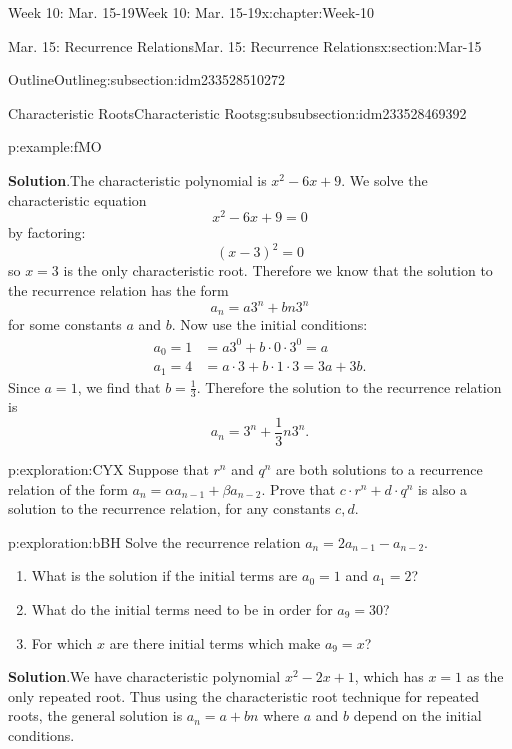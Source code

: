 \documentclass[oneside,10pt,]{book}
\newcommand{\blocktitlefont}{\relax}
\numberwithin{equation}{section}
\newcommand{\amp}{&}
\begin{document}
\begin{chapterptx}{Week 10: Mar. 15-19}{}{Week 10: Mar. 15-19}{}{}{x:chapter:Week-10}
\begin{sectionptx}{Mar. 15: Recurrence Relations}{}{Mar. 15: Recurrence Relations}{}{}{x:section:Mar-15}
\begin{subsectionptx}{Outline}{}{Outline}{}{}{g:subsection:idm233528510272}
\begin{subsubsectionptx}{Characteristic Roots}{}{Characteristic Roots}{}{}{g:subsubsection:idm233528469392}
\begin{example}{}{p:example:fMO}
\par\smallskip%
\noindent\textbf{\blocktitlefont Solution}.\hypertarget{p:solution:NJk}{}\quad{}The characteristic polynomial is \(x^2 - 6x + 9\). We solve the characteristic equation%
\begin{equation*}
x^2 - 6x + 9 = 0
\end{equation*}
by factoring:%
\begin{equation*}
(x - 3)^2 = 0
\end{equation*}
so \(x =3\) is the only characteristic root. Therefore we know that the solution to the recurrence relation has the form%
\begin{equation*}
a_n = a 3^n + bn3^n
\end{equation*}
for some constants \(a\) and \(b\). Now use the initial conditions:%
\begin{align*}
a_0 = 1 \amp = a 3^0 + b\cdot 0 \cdot 3^0 = a\\
a_1 = 4 \amp = a\cdot 3 + b\cdot 1 \cdot3 = 3a + 3b\text{.}
\end{align*}
Since \(a = 1\), we find that \(b = \frac{1}{3}\). Therefore the solution to the recurrence relation is%
\begin{equation*}
a_n = 3^n + \frac{1}{3}n3^n\text{.}
\end{equation*}
%
\end{example}
\begin{exploration}{}{p:exploration:CYX}%
Suppose that \(r^n\) and \(q^n\) are both solutions to a recurrence relation of the form \(a_n = \alpha a_{n-1} + \beta a_{n-2}\). Prove that \(c\cdot r^n + d \cdot q^n\) is also a solution to the recurrence relation, for any constants \(c, d\).%
\end{exploration}%
\begin{exploration}{}{p:exploration:bBH}%
Solve the recurrence relation \(a_n = 2a_{n-1} - a_{n-2}\).%
\begin{enumerate}
\item{}What is the solution if the initial terms are \(a_0 = 1\) and \(a_1 = 2\)?%
\item{}What do the initial terms need to be in order for \(a_9 = 30\)?%
\item{}For which \(x\) are there initial terms which make \(a_9 = x\)?%
\end{enumerate}
%
\par\smallskip%
\noindent\textbf{\blocktitlefont Solution}.\hypertarget{p:solution:kVt}{}\quad{}We have characteristic polynomial \(x^2 - 2x + 1\), which has \(x = 1\) as the only repeated root. Thus using the characteristic root technique for repeated roots, the general solution is \(a_n = a + bn\) where \(a\) and \(b\) depend on the initial conditions.%

\end{exploration}
\end{subsubsectionptx}
\end{subsectionptx}
\end{sectionptx}
\end{chapterptx}
\end{document}
